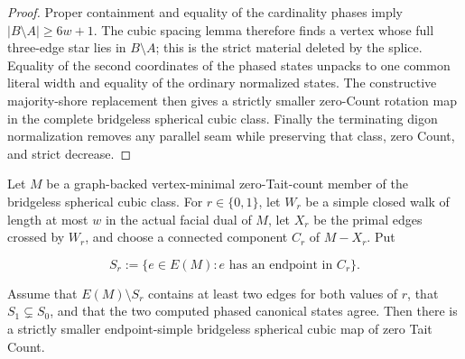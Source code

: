 \begin{proof}
Proper containment and equality of the cardinality phases imply
\(|B\setminus A|\ge 6w+1\).  The cubic spacing lemma therefore finds a
vertex whose full three-edge star lies in \(B\setminus A\); this is the
strict material deleted by the splice.  Equality of the second coordinates
of the phased states unpacks to one common literal width and equality of the
ordinary normalized states.  The constructive majority-shore replacement
then gives a strictly smaller zero-Count rotation map in the complete
bridgeless spherical cubic class.  Finally the terminating digon
normalization removes any parallel seam while preserving that class,
zero Count, and strict decrease.
\end{proof}

\begin{corollary}
\label{cor:dual-noose-literal-replacement}
Let \(M\) be a graph-backed vertex-minimal zero-Tait-count member of the
bridgeless spherical cubic class.  For \(r\in\{0,1\}\), let \(W_r\) be a
simple closed walk of length at most \(w\) in the actual facial dual of
\(M\), let \(X_r\) be the primal edges crossed by \(W_r\), and choose a
connected component \(C_r\) of \(M-X_r\).  Put

\[
 S_r:=\{e\in E(M): e\text{ has an endpoint in }C_r\}.
\]

Assume that \(E(M)\setminus S_r\) contains at least two edges for both
values of \(r\), that \(S_1\subsetneq S_0\), and that the two computed
phased canonical states agree.  Then there is a strictly smaller
endpoint-simple bridgeless spherical cubic map of zero Tait Count.
\end{corollary}

